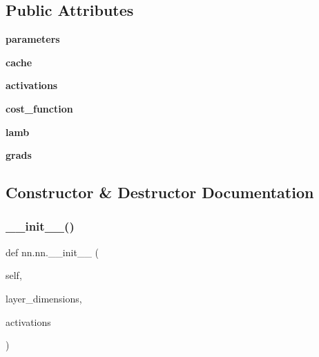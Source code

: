 \subsection*{Public Attributes}
\begin{DoxyCompactItemize}
\item 
\mbox{\label{classnn_1_1nn_a69da89bd6d17dbc8596ab586b7678237}} 
{\bfseries parameters}
\item 
\mbox{\label{classnn_1_1nn_a1f75a6242fc9ee82ca2632e18979b4d3}} 
{\bfseries cache}
\item 
\mbox{\label{classnn_1_1nn_acb7fb4cc0db120b007ef1ab1f82d7ba0}} 
{\bfseries activations}
\item 
\mbox{\label{classnn_1_1nn_adb4a96a154d03db3722022600e134c7f}} 
{\bfseries cost\+\_\+function}
\item 
\mbox{\label{classnn_1_1nn_a11943885141afc3a47049b9d2769fd1b}} 
{\bfseries lamb}
\item 
\mbox{\label{classnn_1_1nn_a50e9804c2895867c31833f877c7d5d60}} 
{\bfseries grads}
\end{DoxyCompactItemize}


\subsection{Constructor \& Destructor Documentation}
\mbox{\label{classnn_1_1nn_ad7304c7932970a07bf2869e97b79e0b5}} 
\subsubsection{\texorpdfstring{\+\_\+\+\_\+init\+\_\+\+\_\+()}{\_\_init\_\_()}}
{\footnotesize\ttfamily def nn.\+nn.\+\_\+\+\_\+init\+\_\+\+\_\+ (\begin{DoxyParamCaption}\item[{}]{self,  }\item[{}]{layer\+\_\+dimensions,  }\item[{}]{activations }\end{DoxyParamCaption})}

